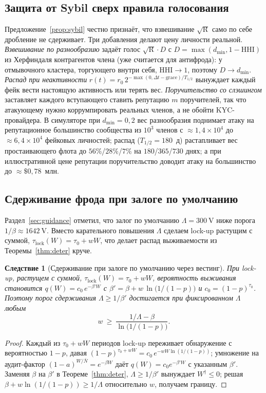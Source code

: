 \documentclass[11pt]{article}
\theoremstyle{plain}
\newtheorem{corollary}{Следствие}
\theoremstyle{definition}
\theoremstyle{remark}
\newcommand{\V}{\mathrm{V}}
\newcommand{\R}{\mathrm{R}}
\begin{document}
\subsection{Защита от Sybil сверх правила голосования}

Предложение~\ref{prop:sybil} честно признаёт, что взвешивание $\sqrt{\R}$ само по себе дробление не сдерживает. Три добавления делают цену личности реальной. \emph{Взвешивание по разнообразию} задаёт голос $\sqrt{\R}\cdot D$ с $D=\max(d_{\min},1-\mathrm{HHI})$ из Херфиндаля контрагентов члена (уже считается для антифрода): у отмывочного кластера, торгующего внутри себя, $\mathrm{HHI}\to1$, поэтому $D\to d_{\min}$. \emph{Распад при неактивности} $r(t)=r_0\,2^{-\max(0,\Delta t-\text{grace})/T_{1/2}}$ вынуждает каждый фейк вести настоящую активность или терять вес. \emph{Поручительство со слэшингом} заставляет каждого вступающего ставить репутацию $m$ поручителей, так что атакующему нужно коррумпировать реальных членов, а не обойти KYC-провайдера. В симуляторе при $d_{\min}=0{,}2$ вес разнообразия поднимает атаку на репутационное большинство сообщества из $10^3$ членов с ${\approx}1{,}4\times10^4$ до ${\approx}6{,}4\times10^4$ фейковых личностей; распад ($T_{1/2}=180$~д) растапливает вес простаивающего флота до $56\%$/$28\%$/$7\%$ на $180$/$365$/$730$ днях; а при иллюстративной цене репутации поручительство доводит атаку на большинство до ${\approx}\$0{,}78$~млн.

\subsection{Сдерживание фрода при залоге по умолчанию}

Раздел~\ref{sec:guidance} отметил, что залог по умолчанию $\Lambda=300~\V$ ниже порога $1/\beta\approx1642~\V$. Вместо карательного повышения $\Lambda$ сделаем lock-up растущим с суммой, $\tau_{\mathrm{lock}}(W)=\tau_0+wW$, что делает распад выживаемости из Теоремы~\ref{thm:deter} круче.

\begin{corollary}[Сдерживание при залоге по умолчанию через вестинг]\label{cor:vesting}
При lock-up, растущем с суммой, $\tau_{\mathrm{lock}}(W)=\tau_0+wW$, вероятность выживания становится $q(W)=c_0\,e^{-\beta' W}$ с $\beta'=\beta+w\,\ln\!\bigl(1/(1-p)\bigr)$ и $c_0=(1-p)^{\tau_0}$. Поэтому порог сдерживания $\Lambda\ge1/\beta'$ достигается при фиксированном $\Lambda$ любым
\[
w\ \ge\ \frac{1/\Lambda-\beta}{\ln\!\bigl(1/(1-p)\bigr)} .
\]
\end{corollary}
\begin{proof}
Каждый из $\tau_0+wW$ периодов lock-up переживает обнаружение с вероятностью $1-p$, давая $(1-p)^{\tau_0+wW}=c_0\,e^{-wW\ln(1/(1-p))}$; умножение на аудит-фактор $(1-a)^{W/\bar N}=e^{-\beta W}$ даёт $q(W)=c_0e^{-\beta'W}$ с указанным $\beta'$. Заменяя $\beta$ на $\beta'$ в Теореме~\ref{thm:deter}, $\Lambda\ge1/\beta'$ вынуждает $W^\dagger\le0$; решая $\beta+w\ln(1/(1-p))\ge1/\Lambda$ относительно $w$, получаем границу.
\end{proof}
\end{document}
